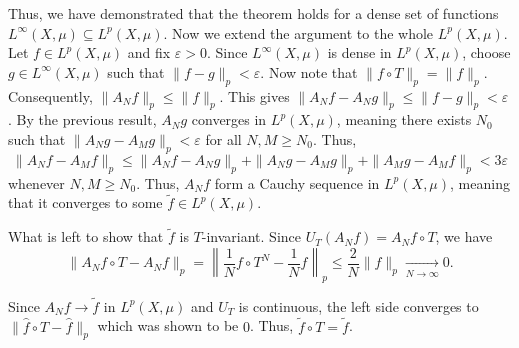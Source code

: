 \documentclass{template}
\begin{document}
Thus, we have demonstrated that the theorem holds for a dense set of functions
$L^{\infty}(X,\mu) \subseteq L^p(X,\mu)$. Now we extend the argument to the
whole $L^p(X,\mu)$. Let $f \in L^p(X,\mu)$ and fix $\varepsilon>0$. Since
$L^{\infty}(X,\mu)$ is dense in $L^p(X,\mu)$, choose $g \in L^{\infty}(X,\mu)$
such that $\|f-g\|_p < \varepsilon$. Now note that $\|f \circ T\|_p = \|f\|_p$.
Consequently, $\|A_Nf\|_p \leq \|f\|_p$. This gives $\|A_Nf - A_Ng\|_p \leq
\|f-g\|_p < \varepsilon$. By the previous result, $A_Ng$ converges in
$L^p(X,\mu)$, meaning there exists $N_0$ such that $\|A_Ng - A_Mg\|_p <
\varepsilon$ for all $N,M \geq N_0$. Thus,
\begin{equation*}
    \|A_Nf - A_Mf\|_p \leq \|A_Nf - A_Ng\|_p + \|A_Ng - A_Mg\|_p + \|A_Mg - A_Mf\|_p < 3\varepsilon
\end{equation*}
whenever $N,M \geq N_0$. Thus, $A_Nf$ form a Cauchy sequence in $L^p(X,\mu)$,
meaning that it converges to some $\widetilde{f} \in L^p(X,\mu)$.

What is left to show that $\widetilde{f}$ is $T$-invariant. Since $U_T(A_Nf) = A_Nf \circ T$, we have 
\begin{equation*}
    \|A_Nf \circ T - A_Nf\|_p = \left\|\frac{1}{N}f \circ T^N - \frac{1}{N}f\right\|_p \leq \frac{2}{N}\|f\|_p \xrightarrow[N \to \infty]{} 0.
\end{equation*}

Since $A_Nf \to \widetilde{f}$ in $L^p(X,\mu)$ and $U_T$ is continuous, the left
side converges to $\|\widehat{f} \circ T - \widehat{f}\|_p$ which was shown to
be $0$. Thus, $\widetilde{f} \circ T = \widetilde{f}$.
\end{document}
